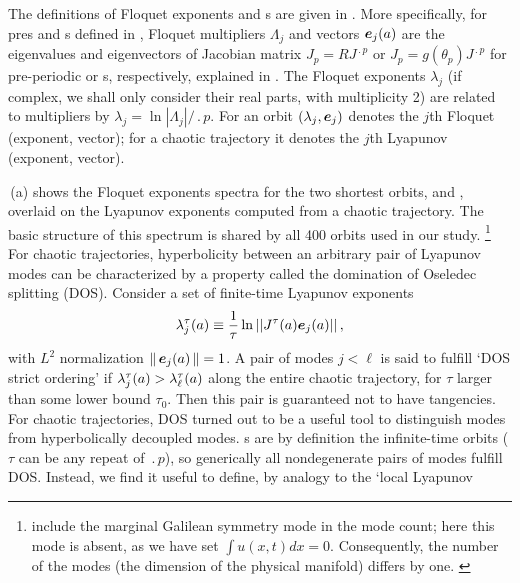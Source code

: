 The definitions of Floquet exponents and \Fv s are given
in . More specifically, for pre\po s and
\rpo s defined in ,
Floquet multipliers $\Lambda_j$ and vectors $\bm{e}_j(a)$ are the
eigenvalues and eigenvectors of Jacobian matrix
$J_p=R J^{\period{p}}$ or $J_p=g(\theta_{p})J^{\period{p}}$ for
pre-periodic or \rpo s, respectively, explained in .
The Floquet exponents $\lambda_j$
(if complex, we shall only consider their real parts, with multiplicity 2)
are related to multipliers by $\lambda_j=\ln|\Lambda_j|/\period{p}$.
For an orbit $(\lambda_j,\bm{e}_j)$ denotes the $j$th Floquet
(exponent, vector); for a chaotic trajectory it denotes the
$j$th Lyapunov (exponent, vector).

\,(a) shows the Floquet exponents spectra for the two
shortest orbits,  and ,
overlaid on the Lyapunov exponents computed from a chaotic trajectory.
The basic structure of this spectrum is shared by all 400
orbits used in our study.
\footnote{
   include the marginal
  Galilean symmetry mode in the mode count; here this mode is
  absent, as we have set $\int{}u(x,t)dx=0$. Consequently, the
  number of the {\entangled} modes (the dimension of the physical
  manifold) differs by one.
  \label{fn:KazzNt1}
}
For chaotic trajectories, hyperbolicity between an arbitrary pair of
Lyapunov modes can be characterized by a property called the domination
of Oseledec splitting (DOS).
Consider a set of finite-time Lyapunov exponents
\begin{equation}
  \lambda_j^\tau(a)
  \equiv
  \frac{1}{\tau}\ln ||J^\tau(a)\bm{e}_j(a)||
  \,,
  \label{eq:ftle}
\end{equation}
with $L^2$ normalization $\left\Arrowvert \, \bm{e}_j(a) \, \right\Arrowvert=1$.
A pair of modes $j<\ell$ is said to fulfill `DOS strict ordering'
if $\lambda_{j}^\tau(a)>\lambda_{\ell}^\tau(a)$
along the entire chaotic trajectory, for $\tau$ larger than some lower
bound $\tau_0$. Then this pair is guaranteed not to have
tangencies.
For chaotic trajectories, DOS turned out to be a useful tool to
distinguish {\entangled} modes from hyperbolically decoupled {\transient}
modes.
\Po s are by definition the infinite-time orbits  ($\tau$ can be any repeat
of $\period{p}$), so generically all nondegenerate pairs of modes fulfill DOS.
Instead, we find it useful to define, by analogy to the `local Lyapunov
